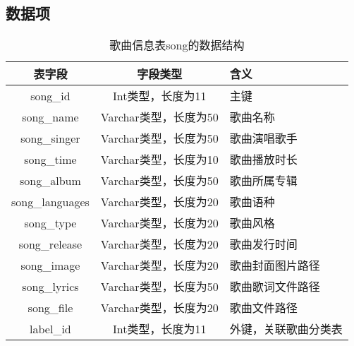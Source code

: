 \documentclass[UTF8,14pt]{article}
\numberwithin{figure}{subsubsection}
\numberwithin{table}{subsubsection}
\begin{document}
\subsection{数据项}
\begin{table}[H]
	\centering
	\setlength{\abovecaptionskip}{0.cm}
	\setlength{\belowcaptionskip}{0.cm}
	\begin{tabular}{|c|c|c|}
		\hline
		\multicolumn{1}{|c|}{表字段}          & \multicolumn{1}{c|}{字段类型}              & \multicolumn{1}{l|}{含义}             \\ \hline
		\multicolumn{1}{|c|}{song\_id}        & \multicolumn{1}{c|}{Int类型，长度为11}     & \multicolumn{1}{l|}{主键}             \\ \hline
		\multicolumn{1}{|c|}{song\_name}      & \multicolumn{1}{c|}{Varchar类型，长度为50} & \multicolumn{1}{l|}{歌曲名称}         \\ \hline
		\multicolumn{1}{|c|}{song\_singer}    & \multicolumn{1}{l|}{Varchar类型，长度为50} & \multicolumn{1}{l|}{歌曲演唱歌手}     \\ \hline
		\multicolumn{1}{|c|}{song\_time}      & \multicolumn{1}{c|}{Varchar类型，长度为10} & \multicolumn{1}{l|}{歌曲播放时长}     \\ \hline
		\multicolumn{1}{|c|}{song\_album}     & \multicolumn{1}{c|}{Varchar类型，长度为50} & \multicolumn{1}{l|}{歌曲所属专辑}     \\ \hline
		\multicolumn{1}{|c|}{song\_languages} & \multicolumn{1}{c|}{Varchar类型，长度为20} & \multicolumn{1}{l|}{歌曲语种}         \\ \hline
		\multicolumn{1}{|c|}{song\_type}      & \multicolumn{1}{c|}{Varchar类型，长度为20} & \multicolumn{1}{l|}{歌曲风格}         \\ \hline
		\multicolumn{1}{|c|}{song\_release}   & \multicolumn{1}{c|}{Varchar类型，长度为20} & \multicolumn{1}{l|}{歌曲发行时间}     \\ \hline
		\multicolumn{1}{|c|}{song\_image}     & \multicolumn{1}{c|}{Varchar类型，长度为20} & \multicolumn{1}{l|}{歌曲封面图片路径} \\ \hline
		\multicolumn{1}{|c|}{song\_lyrics}    & \multicolumn{1}{c|}{Varchar类型，长度为50} & \multicolumn{1}{l|}{歌曲歌词文件路径} \\ \hline
		\multicolumn{1}{|c|}{song\_file}      & \multicolumn{1}{c|}{Varchar类型，长度为20} & \multicolumn{1}{l|}{歌曲文件路径}     \\ \hline
		label\_id                             & Int类型，长度为11                          & 外键，关联歌曲分类表                  \\ \hline
	\end{tabular}
	\caption{歌曲信息表song的数据结构}
\end{table}
\end{document}
